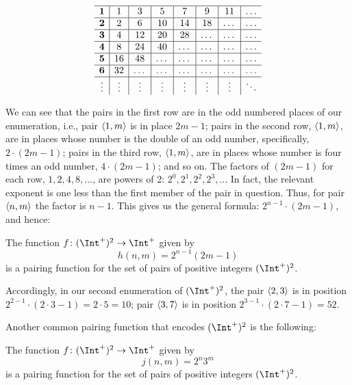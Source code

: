 \documentclass[../../../include/open-logic-section]{subfiles}
\begin{document}
\begin{explain}
\[\begin{array}{ c | c | c | c | c | c | c | c }
\hline
\textbf 1 & 1 & 3 & 5 & 7 & 9 & 11 & \dots \\
\hline
\textbf 2 & 2 & 6 & 10 & 14 & 18 & \dots & \dots \\
\hline
\textbf 3 & 4 & 12 & 20 & 28 & \dots & \dots & \dots \\
\hline
\textbf 4 & 8 & 24 & 40 & \dots & \dots & \dots & \dots \\
\hline
\textbf 5 & 16 & 48 & \dots & \dots & \dots & \dots & \dots \\
\hline
\textbf 6 & 32 & \dots & \dots & \dots & \dots & \dots & \dots \\
\hline
\vdots & \vdots & \vdots & \vdots & \vdots & \vdots & \vdots & \ddots\\
\end{array}
\]

We can see that the pairs in the first row are in the odd numbered places of our enumeration, i.e., pair $\langle 1,m \rangle$ is in place $2m-1$; pairs in the second row, $\langle 1,m \rangle$, are in places whose number is the double of an odd number, specifically,  $2 \cdot (2m-1)$; pairs in the third row, $\langle 1,m \rangle$, are in places whose number is four times an odd number, $4 \cdot (2m-1)$; and so on. The factors of $(2m-1)$ for each row, $1, 2, 4, 8, \dots$, are powers of 2: $2^0, 2^1, 2^2, 2^3, \dots$ In fact, the relevant exponent is one less than the first member of the pair in question. Thus, for pair $\langle n,m \rangle$ the factor is $n-1$.  This gives us the general formula: $2^{n-1} \cdot (2m-1)$, and hence:
\end{explain}
\begin{ex}
The function $f\colon (\Int^+)^2 \to \Int^+$ given by
\[
h(n,m) = 2^{n-1} (2m-1)
\]
is a pairing function for the set of pairs of positive integers $(\Int^+)^2$.
\end{ex}
\begin{explain}
Accordingly, in our second enumeration of $(\Int^+)^2$, the pair $\langle 2,3 \rangle$ is in position $2^{2-1} \cdot (2 \cdot 3 - 1) = 2 \cdot 5 = 10$; pair $\langle 3,7 \rangle$ is in position $2^{3-1} \cdot (2 \cdot 7 - 1)  = 52$.
\end{explain}

Another common pairing function that encodes $(\Int^+)^2$ is the following:
\begin{ex}
The function $f\colon (\Int^+)^2 \to \Int^+$ given by
\[
j(n,m) = 2^n3^m
\]
is a pairing function for the set of pairs of positive integers $(\Int^+)^2$.
\end{ex}
\end{document}
